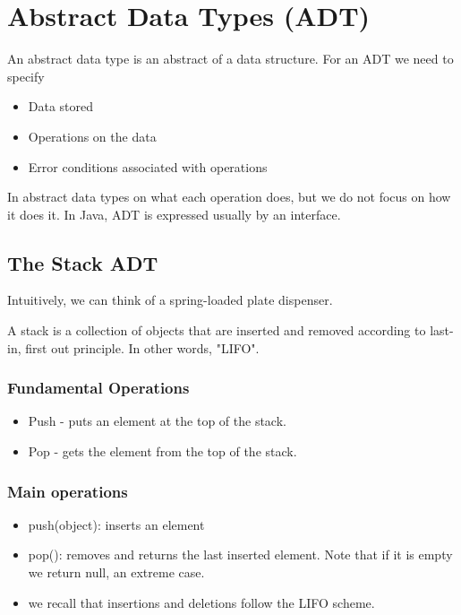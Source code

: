 \documentclass[a4paper]{article}
\theoremstyle{plain}
\theoremstyle{definition}
\newtheorem{defn}{Definition}[section]
\theoremstyle{remark}
\begin{document}
\section{Abstract Data Types (ADT)}
\begin{tcolorbox}[colback=black!3!white,colframe=black!60!white,title=\begin{defn}Abstract Data Type \label{Abstract Data Type}\end{defn}]
An abstract data type is an abstract of a data structure. For an ADT we need to specify
\begin{itemize}
	\item Data stored
	\item Operations on the data
	\item Error conditions associated with operations
\end{itemize}
In abstract data types on what each operation does, but we do not focus on how it does it. In Java, ADT is expressed usually by an interface.
\end{tcolorbox}
\subsection{The Stack ADT}
Intuitively, we can think of a spring-loaded plate dispenser. 
\begin{tcolorbox}[colback=black!3!white,colframe=black!60!white,title=\begin{defn}Stack \label{Stack}\end{defn}]
A stack is a collection of objects that are inserted and removed according to last-in, first out principle. In other words, "LIFO". 
\end{tcolorbox}
\subsubsection{Fundamental Operations}

\begin{itemize}
	\item Push - puts an element at the top of the stack.
	\item Pop - gets the element from the top of the stack.
\end{itemize}
\subsubsection{Main operations}

\begin{itemize}
	\item push(object): inserts an element
	\item pop(): removes and returns the last inserted element. Note that if it is empty we return null, an extreme case.
	\item we recall that insertions and deletions follow the LIFO scheme.
\end{itemize}
\end{document}
